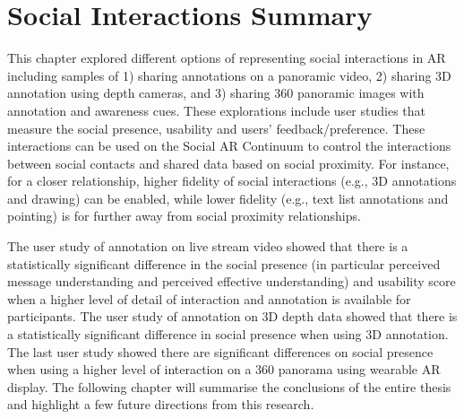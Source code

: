 \section{Social Interactions Summary}

This chapter explored different options of representing social interactions in AR including samples of 1) sharing annotations on a panoramic video, 2) sharing 3D annotation using depth cameras, and 3) sharing 360 panoramic images with annotation and awareness cues. These explorations include user studies that measure the social presence, usability and users' feedback/preference. These interactions can be used on the Social AR Continuum to control the interactions between social contacts and shared data based on social proximity. For instance, for a closer relationship, higher fidelity of social interactions (e.g., 3D annotations and drawing) can be enabled, while lower fidelity (e.g., text list annotations and pointing) is for further away from social proximity relationships.

The user study of annotation on live stream video showed that there is a statistically significant difference in the social presence (in particular perceived message understanding and perceived effective understanding) and usability score when a higher level of detail of interaction and annotation is available for participants. The user study of annotation on 3D depth data showed that there is a statistically significant difference in social presence when using 3D annotation. The last user study showed there are significant differences on social presence when using a higher level of interaction on a 360 panorama using wearable AR display. The following chapter will summarise the conclusions of the entire thesis and highlight a few future directions from this research.
